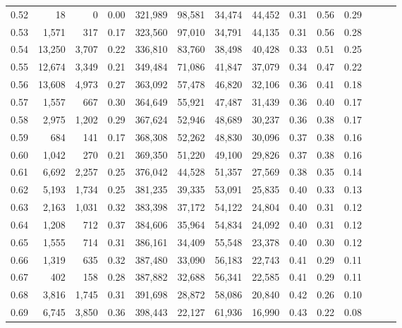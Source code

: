 \begin{tabular}{rrrrrrrrrrrrrr}
0.52 &      18 &      0 &  0.00 &  321,989 &   98,581 &  34,474 &  44,452 &  0.31 &  0.56 &      0.29 \\
0.53 &   1,571 &    317 &  0.17 &  323,560 &   97,010 &  34,791 &  44,135 &  0.31 &  0.56 &      0.28 \\
0.54 &  13,250 &  3,707 &  0.22 &  336,810 &   83,760 &  38,498 &  40,428 &  0.33 &  0.51 &      0.25 \\
0.55 &  12,674 &  3,349 &  0.21 &  349,484 &   71,086 &  41,847 &  37,079 &  0.34 &  0.47 &      0.22 \\
0.56 &  13,608 &  4,973 &  0.27 &  363,092 &   57,478 &  46,820 &  32,106 &  0.36 &  0.41 &      0.18 \\
0.57 &   1,557 &    667 &  0.30 &  364,649 &   55,921 &  47,487 &  31,439 &  0.36 &  0.40 &      0.17 \\
0.58 &   2,975 &  1,202 &  0.29 &  367,624 &   52,946 &  48,689 &  30,237 &  0.36 &  0.38 &      0.17 \\
0.59 &     684 &    141 &  0.17 &  368,308 &   52,262 &  48,830 &  30,096 &  0.37 &  0.38 &      0.16 \\
0.60 &   1,042 &    270 &  0.21 &  369,350 &   51,220 &  49,100 &  29,826 &  0.37 &  0.38 &      0.16 \\
0.61 &   6,692 &  2,257 &  0.25 &  376,042 &   44,528 &  51,357 &  27,569 &  0.38 &  0.35 &      0.14 \\
0.62 &   5,193 &  1,734 &  0.25 &  381,235 &   39,335 &  53,091 &  25,835 &  0.40 &  0.33 &      0.13 \\
0.63 &   2,163 &  1,031 &  0.32 &  383,398 &   37,172 &  54,122 &  24,804 &  0.40 &  0.31 &      0.12 \\
0.64 &   1,208 &    712 &  0.37 &  384,606 &   35,964 &  54,834 &  24,092 &  0.40 &  0.31 &      0.12 \\
0.65 &   1,555 &    714 &  0.31 &  386,161 &   34,409 &  55,548 &  23,378 &  0.40 &  0.30 &      0.12 \\
0.66 &   1,319 &    635 &  0.32 &  387,480 &   33,090 &  56,183 &  22,743 &  0.41 &  0.29 &      0.11 \\
0.67 &     402 &    158 &  0.28 &  387,882 &   32,688 &  56,341 &  22,585 &  0.41 &  0.29 &      0.11 \\
0.68 &   3,816 &  1,745 &  0.31 &  391,698 &   28,872 &  58,086 &  20,840 &  0.42 &  0.26 &      0.10 \\
0.69 &   6,745 &  3,850 &  0.36 &  398,443 &   22,127 &  61,936 &  16,990 &  0.43 &  0.22 &      0.08 \\

\end{tabular}

